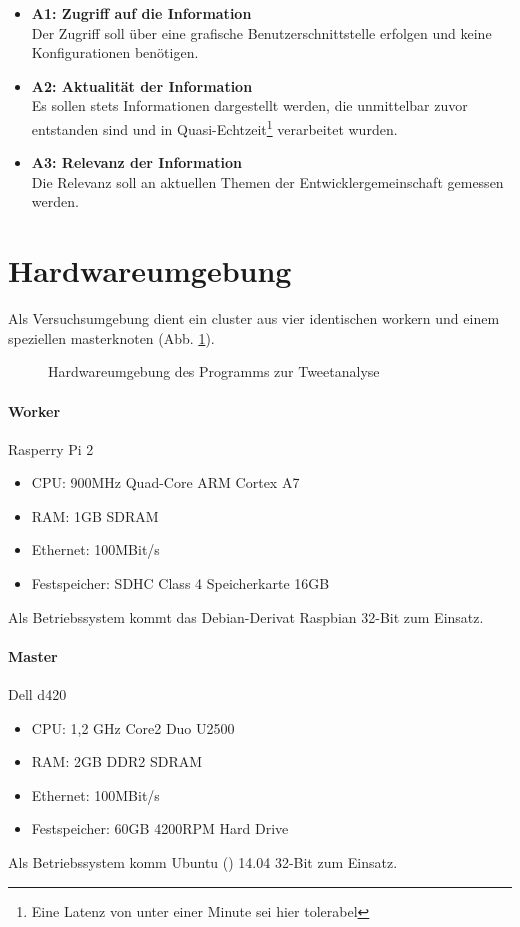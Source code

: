\begin{itemize}
	\item \textbf{A1: Zugriff auf die Information}\\
	Der Zugriff soll über eine grafische Benutzerschnittstelle erfolgen und keine Konfigurationen benötigen.
	\item \textbf{A2: Aktualität der Information}\\
	Es sollen stets Informationen dargestellt werden, die unmittelbar zuvor entstanden sind und in Quasi-Echtzeit\footnote{Eine Latenz von unter einer Minute sei hier tolerabel} verarbeitet wurden.
	\item \textbf{A3: Relevanz der Information}\\
	Die Relevanz soll an aktuellen Themen der Entwicklergemeinschaft gemessen werden.
\end{itemize}


\section{Hardwareumgebung}

Als Versuchsumgebung dient ein \gls{cluster} aus vier identischen \gls{worker}n und einem speziellen \gls{master}knoten (Abb. \ref{figure:versuchsaufbau}).

\begin{figure}[h]
	\centering
  
	\caption{Hardwareumgebung des Programms zur Tweetanalyse}
	\label{figure:versuchsaufbau}
\end{figure}

\paragraph{Worker}
Rasperry Pi 2
\begin{itemize}
	\item CPU: 900MHz Quad-Core ARM Cortex A7
	\item RAM: 1GB SDRAM
	\item Ethernet: 100MBit/s
	\item Festspeicher: SDHC Class 4 Speicherkarte 16GB
\end{itemize}
Als Betriebssystem kommt das Debian-Derivat Raspbian\cite{raspbian} 32-Bit zum Einsatz.

\paragraph{Master}
Dell d420
\begin{itemize}
	\item CPU: 1,2 GHz Core2 Duo U2500
	\item RAM: 2GB DDR2 SDRAM
	\item Ethernet: 100MBit/s
	\item Festspeicher: 60GB 4200RPM Hard Drive
\end{itemize}
Als Betriebssystem komm Ubuntu (\cite{ubuntu}) 14.04 32-Bit zum Einsatz.

